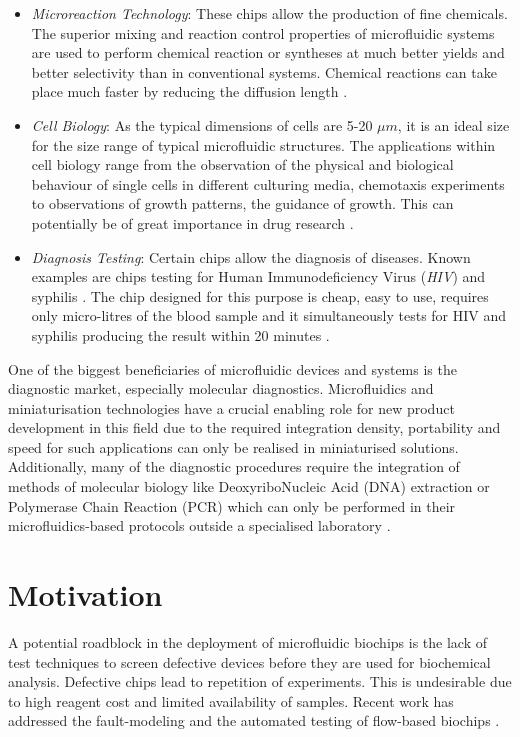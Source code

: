\begin{itemize}
\item \emph{Microreaction Technology}: These chips allow the production of fine chemicals. The superior mixing and reaction control properties of microfluidic systems are used to perform chemical reaction or syntheses at much better yields and better selectivity than in conventional systems. Chemical reactions can take place much faster by reducing the diffusion length \cite{life-sciences-microfluidics}.

\item \emph{Cell Biology}: As the typical dimensions of cells are 5-20 $\mu m$, it is an ideal size for the size range of typical microfluidic structures. The applications within cell biology range from the observation of the physical and biological behaviour of single cells in different culturing media, chemotaxis experiments to observations of growth patterns, the guidance of growth. This can potentially be of great importance in drug research \cite{life-sciences-microfluidics}.

\item \emph{Diagnosis Testing}: Certain chips allow the diagnosis of diseases. Known examples are chips testing for Human Immunodeficiency Virus (\emph{HIV}) and syphilis \cite{wajid}. The chip designed for this purpose is cheap, easy to use, requires only micro-litres of the blood sample and it simultaneously tests for HIV and syphilis producing the result within 20 minutes \cite{wajid}.

\end{itemize}


One of the biggest beneficiaries of microfluidic devices and systems is the diagnostic market, especially molecular diagnostics. Microfluidics and miniaturisation technologies have a crucial enabling role for new product development in this field due to the required integration density, portability and speed for such applications can only be realised in miniaturised solutions. Additionally, many of the diagnostic procedures require the integration of methods of molecular biology like DeoxyriboNucleic Acid (DNA) extraction or Polymerase Chain Reaction (PCR) which can only be performed in their microfluidics-based protocols outside a specialised laboratory \cite{life-sciences-microfluidics}.

\section{Motivation}
A potential roadblock in the deployment of microfluidic biochips is the lack of test techniques to screen defective devices before they are used for biochemical analysis. Defective chips lead to repetition of experiments. This is undesirable due to high reagent cost and limited availability of samples. %
Recent work has addressed the fault-modeling and the automated testing of flow-based biochips \cite{fault-modeling}.


